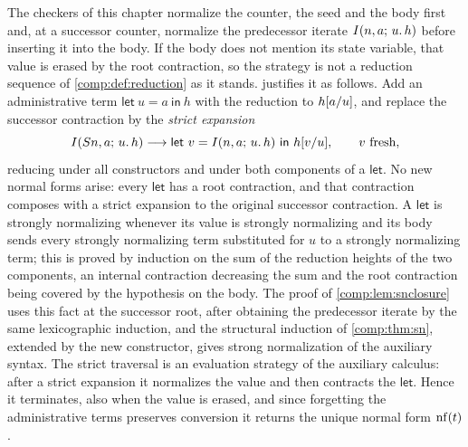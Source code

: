 \begin{remark}
\label{disch:rem:strict}
The checkers of this chapter normalize the counter, the seed and the body
first and, at a successor counter, normalize the predecessor iterate
$I(n,a;\,u.\,h)$ before inserting it into the body. If the body does not
mention its state variable, that value is erased by the root contraction,
so the strategy is not a reduction sequence of \cref{comp:def:reduction}
as it stands.  justifies it as follows. Add an
administrative term $\mathsf{let}\ u=a\ \mathsf{in}\ h$ with the reduction
to $h[a/u]$, and replace the successor contraction by the
\emph{strict expansion}
\[
 I(S n,a;\,u.\,h)\longrightarrow
 \mathsf{let}\ v=I(n,a;\,u.\,h)\ \mathsf{in}\ h[v/u],
 \qquad v\text{ fresh},
\]
reducing under all constructors and under both components of a
$\mathsf{let}$. No new normal forms arise: every $\mathsf{let}$ has a root
contraction, and that contraction composes with a strict expansion to the
original successor contraction. A $\mathsf{let}$ is strongly normalizing
whenever its value is strongly normalizing and its body sends every
strongly normalizing term substituted for $u$ to a strongly normalizing
term; this is proved by induction on the sum of the reduction heights of
the two components, an internal contraction decreasing the sum and the
root contraction being covered by the hypothesis on the body. The proof of
\cref{comp:lem:snclosure} uses this fact at the successor root, after
obtaining the predecessor iterate by the same lexicographic induction, and
the structural induction of \cref{comp:thm:sn}, extended by the new
constructor, gives strong normalization of the auxiliary syntax. The
strict traversal is an evaluation strategy of the auxiliary calculus:
after a strict expansion it normalizes the value and then contracts the
$\mathsf{let}$. Hence it terminates, also when the value is erased, and
since forgetting the administrative terms preserves conversion it returns
the unique normal form $\operatorname{nf}(t)$.
\end{remark}

